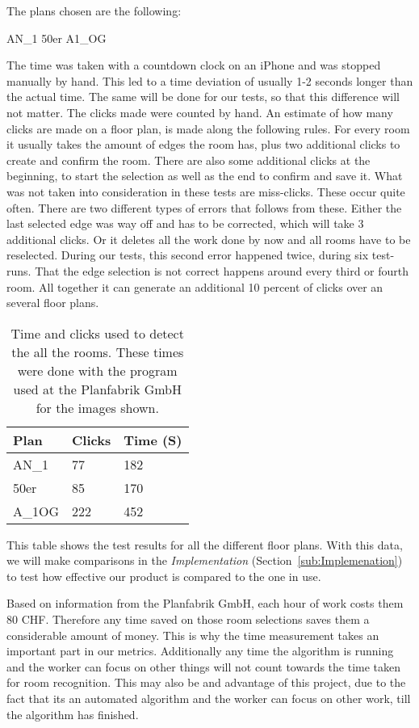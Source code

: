 The plans chosen are the following:

AN\_1
50er
A1\_OG



The time was taken with a countdown clock on an iPhone and was stopped manually by hand. This led to a time deviation of usually 1-2 seconds longer than the actual time. The same will be done for our tests, so that this difference will not matter. The clicks made were counted by hand.
An estimate of how many clicks are made on a floor plan, is made along the following rules. For every room it usually takes the amount of edges the room has, plus two additional clicks to create and confirm the room. There are also some additional clicks at the beginning, to start the selection as well as the end to confirm and save it.
What was not taken into consideration in these tests are miss-clicks. These occur quite often. There are two different types of errors that follows from these. Either the last selected edge was way off and has to be corrected, which will take 3 additional clicks. Or it deletes all the work done by now and all rooms have to be reselected. During our tests, this second error happened twice, during six test-runs. That the edge selection is not correct happens around every third or fourth room. All together it can generate an additional 10 percent of clicks over an several floor plans.

\begin{table}[H]
	\centering
	\begin{tabular}{@{}lll@{}}
		\toprule
		Plan          & Clicks & Time (S) \\ \midrule
		AN\_1         & 77     & 182 \\
		50er          & 85     & 170  \\
		A\_1OG        & 222    & 452 \\ \bottomrule
	\end{tabular}
\caption{Time and clicks used to detect the all the rooms. These times were done with the program used at the Planfabrik GmbH for the images shown. }
\end{table}

This table shows the test results for all the different floor plans. With this data, we will make comparisons in the \textit{Implementation} (Section~\ref{sub:Implemenation}) to test how effective our product is compared to the one in use.

Based on information from the Planfabrik GmbH, each hour of work costs them 80 CHF. Therefore any time saved on those room selections saves them a considerable amount of money. This is why the time measurement takes an important part in our metrics. Additionally any time the algorithm is running and the worker can focus on other things will not count towards the time taken for room recognition. This may also be and advantage of this project, due to the fact that its an automated algorithm and the worker can focus on other work, till the algorithm has finished.

